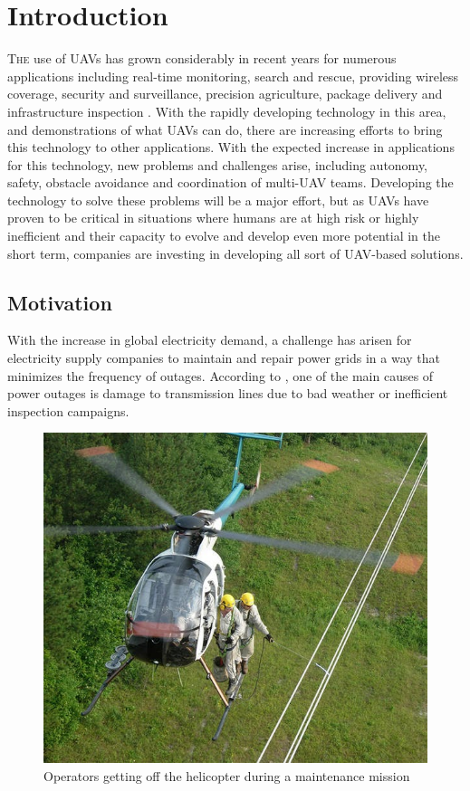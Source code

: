 \chapter{Introduction}
\label{ch:Introduction}
\lettrine[lraise=-0.1, lines=2, loversize=0.2]{T}{he} use of \glspl{UAV} has grown considerably in recent years for numerous applications including real-time monitoring, search and rescue, providing wireless coverage, security and surveillance, precision agriculture, package delivery and infrastructure inspection \cite{CivilAplications}. With the rapidly developing technology in this area, and demonstrations of what \glspl{UAV} can do, there are increasing efforts to bring this technology to other applications. With the expected increase in applications for this technology, new problems and challenges arise, including autonomy, safety, obstacle avoidance and coordination of multi-\gls{UAV} teams. Developing the technology to solve these problems will be a major effort, but as \glspl{UAV} have proven to be critical in situations where humans are at high risk or highly inefficient and their capacity to evolve and develop even more potential in the short term, companies are investing in developing all sort of \gls{UAV}-based solutions.

\section{Motivation}
\label{sec:Motivation}
With the increase in global electricity demand, a challenge has arisen for electricity supply companies to maintain and repair power grids in a way that minimizes the frequency of outages. According to \cite{PowerOutagesCauses}, one of the main causes of power outages is damage to transmission lines due to bad weather or inefficient inspection campaigns.

\begin{figure}[htbp]
    \centering
    \includegraphics[width=0.5\linewidth]
    {Introduction/figures/helicopter.jpg}
    \caption{Operators getting off the helicopter during a maintenance mission}
    \label{fig:helicopter}
\end{figure}

